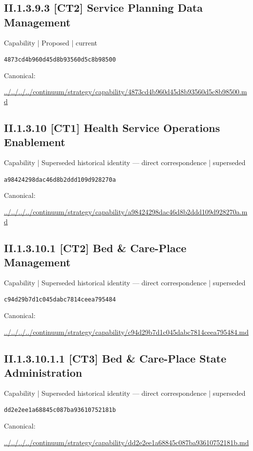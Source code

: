 \documentclass[10pt,a4paper]{article}
\begin{document}
\subsection*{II.1.3.9.3 [CT2] Service Planning Data Management}
{\small Capability | Proposed | current}\par
\texttt{4873cd4b960d45d8b93560d5c8b98500}\par
Canonical: \par
{\footnotesize\url{../../../../continuum/strategy/capability/4873cd4b960d45d8b93560d5c8b98500.md}}\par
\subsection*{II.1.3.10 [CT1] Health Service Operations Enablement}
{\small Capability | Superseded historical identity — direct correspondence | superseded}\par
\texttt{a98424298dac46d8b2ddd109d928270a}\par
Canonical: \par
{\footnotesize\url{../../../../continuum/strategy/capability/a98424298dac46d8b2ddd109d928270a.md}}\par
\subsection*{II.1.3.10.1 [CT2] Bed \& Care-Place Management}
{\small Capability | Superseded historical identity — direct correspondence | superseded}\par
\texttt{c94d29b7d1c045dabc7814ceea795484}\par
Canonical: \par
{\footnotesize\url{../../../../continuum/strategy/capability/c94d29b7d1c045dabc7814ceea795484.md}}\par
\subsection*{II.1.3.10.1.1 [CT3] Bed \& Care-Place State Administration}
{\small Capability | Superseded historical identity — direct correspondence | superseded}\par
\texttt{dd2e2ee1a68845c087ba93610752181b}\par
Canonical: \par
{\footnotesize\url{../../../../continuum/strategy/capability/dd2e2ee1a68845c087ba93610752181b.md}}\par
\end{document}

